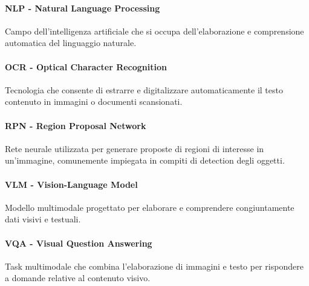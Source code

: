 \documentclass[main.tex]{subfiles}
\begin{document}
\paragraph{NLP - Natural Language Processing} 
Campo dell'intelligenza artificiale che si occupa dell'elaborazione e comprensione automatica del linguaggio naturale.

\paragraph{OCR - Optical Character Recognition} 
Tecnologia che consente di estrarre e digitalizzare automaticamente il testo contenuto in immagini o documenti scansionati.

\paragraph{RPN - Region Proposal Network} 
Rete neurale utilizzata per generare proposte di regioni di interesse in un'immagine, comunemente impiegata in compiti di detection degli oggetti.

\paragraph{VLM - Vision-Language Model} 
Modello multimodale progettato per elaborare e comprendere congiuntamente dati visivi e testuali.

\paragraph{VQA - Visual Question Answering} 
Task multimodale che combina l'elaborazione di immagini e testo per rispondere a domande relative al contenuto visivo.
\end{document}
